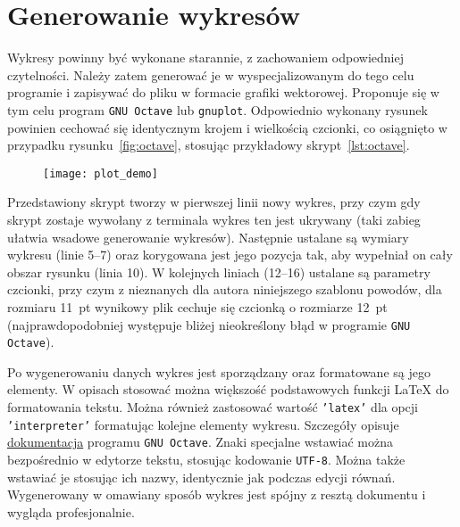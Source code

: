\chapter{Generowanie wykresów}

Wykresy powinny być wykonane starannie, z zachowaniem odpowiedniej czytelności. Należy zatem generować je w wyspecjalizowanym do tego celu programie i zapisywać do pliku w formacie grafiki wektorowej. Proponuje się w tym celu program \texttt{GNU Octave} lub \texttt{gnuplot}. Odpowiednio wykonany rysunek powinien cechować się identycznym krojem i wielkością czcionki, co osiągnięto w przypadku rysunku~\ref{fig:octave}, stosując przykładowy skrypt~\ref{lst:octave}.

\begin{figure}[htb!]
\centering
\texttt{[image: plot\_demo]}
\end{figure}

Przedstawiony skrypt tworzy w pierwszej linii nowy wykres, przy czym gdy skrypt zostaje wywołany z terminala wykres ten jest ukrywany (taki zabieg ułatwia wsadowe generowanie wykresów). Następnie ustalane są wymiary wykresu (linie 5--7) oraz korygowana jest jego pozycja tak, aby wypełniał on cały obszar rysunku (linia 10). W kolejnych liniach (12--16) ustalane są parametry czcionki, przy czym z nieznanych dla autora niniejszego szablonu powodów, dla rozmiaru \qty{11}{pt} wynikowy plik cechuje się czcionką o rozmiarze \qty{12}{pt} (najprawdopodobniej występuje bliżej nieokreślony błąd w programie \texttt{GNU Octave}).

Po wygenerowaniu danych wykres jest sporządzany oraz formatowane są jego elementy. W opisach stosować można większość podstawowych funkcji \LaTeX{} do formatowania tekstu. Można również zastosować wartość \texttt{'latex'} dla opcji \texttt{'interpreter'} formatując kolejne elementy wykresu. Szczegóły opisuje \href{https://docs.octave.org/latest}{dokumentacja} programu \texttt{GNU Octave}. Znaki specjalne wstawiać można bezpośrednio w edytorze tekstu, stosując kodowanie \texttt{UTF-8}. Można także wstawiać je stosując ich nazwy, identycznie jak podczas edycji równań. Wygenerowany w omawiany sposób wykres jest spójny z resztą dokumentu i wygląda profesjonalnie.

\begin{listing}[hbt!]
\inputminted[linenos, breaklines]{octave}{skrypty/plot_demo.m}
\end{listing}

